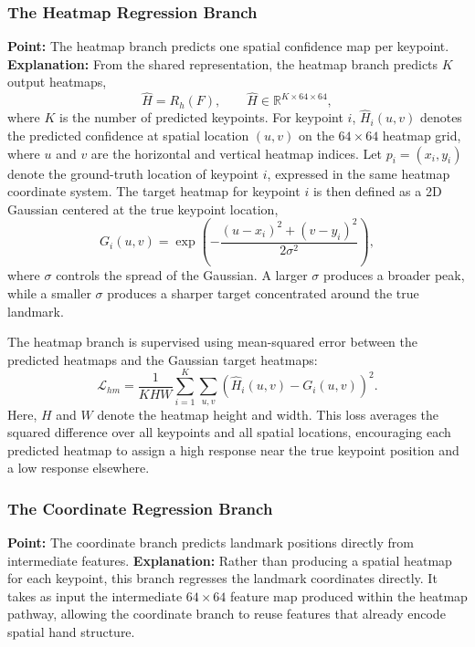 \documentclass[10pt,letterpaper]{article}
\begin{document}
\subsubsection{The Heatmap Regression Branch}

\noindent\textbf{Point:} The heatmap branch predicts one spatial confidence map per keypoint.  
\textbf{Explanation:} From the shared representation, the heatmap branch predicts \(K\) output heatmaps,
\[
\hat{H} = R_h(F), \qquad \hat{H} \in \mathbb{R}^{K \times 64 \times 64},
\]
where \(K\) is the number of predicted keypoints. For keypoint \(i\), \(\hat{H}_i(u,v)\) denotes the predicted confidence at spatial location \((u,v)\) on the \(64 \times 64\) heatmap grid, where \(u\) and \(v\) are the horizontal and vertical heatmap indices. Let \(p_i = (x_i, y_i)\) denote the ground-truth location of keypoint \(i\), expressed in the same heatmap coordinate system. The target heatmap for keypoint \(i\) is then defined as a 2D Gaussian centered at the true keypoint location,
\[
G_i(u,v) = \exp\left(
-\frac{(u-x_i)^2 + (v-y_i)^2}{2\sigma^2}
\right),
\]
where \(\sigma\) controls the spread of the Gaussian. A larger \(\sigma\) produces a broader peak, while a smaller \(\sigma\) produces a sharper target concentrated around the true landmark.

The heatmap branch is supervised using mean-squared error between the predicted heatmaps and the Gaussian target heatmaps:
\[
\mathcal{L}_{hm}
=
\frac{1}{KHW}
\sum_{i=1}^{K}
\sum_{u,v}
\left(\hat{H}_i(u,v) - G_i(u,v)\right)^2.
\]
Here, \(H\) and \(W\) denote the heatmap height and width. This loss averages the squared difference over all keypoints and all spatial locations, encouraging each predicted heatmap to assign a high response near the true keypoint position and a low response elsewhere. 

\subsubsection{The Coordinate Regression Branch}

\noindent\textbf{Point:} The coordinate branch predicts landmark positions directly from intermediate features.  
\textbf{Explanation:} Rather than producing a spatial heatmap for each keypoint, this branch regresses the landmark coordinates directly. It takes as input the intermediate \(64 \times 64\) feature map produced within the heatmap pathway, allowing the coordinate branch to reuse features that already encode spatial hand structure.
\end{document}
